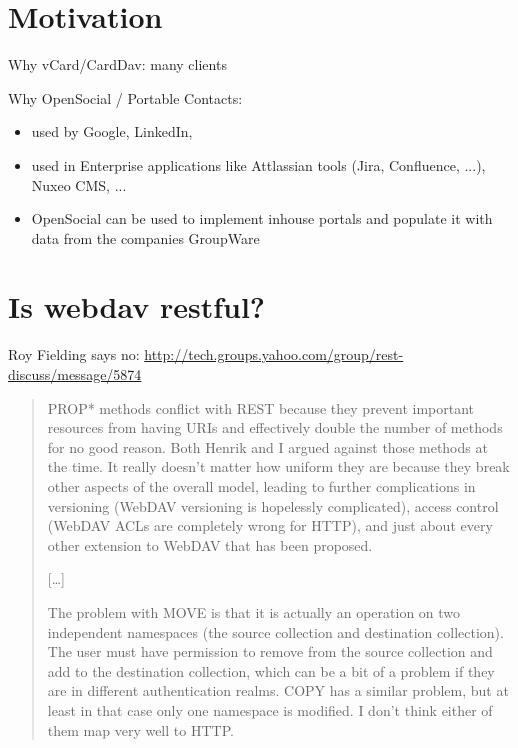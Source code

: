\documentclass[12pt,a4paper]{scrartcl}		%
\begin{document}
\title{}
\subtitle{}
\author{Thomas Koch\\\url{thomas@koch.ro}\\matriculation number 7250371}
\publishers{Fernuniversität Hagen\\Faculty of mathematics and computer science}
\date{\today}
\maketitle{}

\tableofcontents{}
\begin{abstract}

\end{abstract}
\newpage{}

\section{Motivation}

Why vCard/CardDav: many clients

Why OpenSocial / Portable Contacts:
\begin{itemize}
\item used by Google, LinkedIn,
\item used in Enterprise applications like Attlassian tools (Jira, Confluence, ...), Nuxeo CMS, ...
\item OpenSocial can be used to implement inhouse portals and populate it with data from the companies GroupWare
\end{itemize}

\section{Is webdav restful?}

Roy Fielding says no: \url{http://tech.groups.yahoo.com/group/rest-discuss/message/5874}

\begin{quotation}
PROP* methods conflict with REST because they prevent
important resources from having URIs and effectively double the
number of methods for no good reason. Both Henrik and I argued
against those methods at the time. It really doesn't matter
how uniform they are because they break other aspects of the
overall model, leading to further complications in versioning
(WebDAV versioning is hopelessly complicated), access control
(WebDAV ACLs are completely wrong for HTTP), and just about every
other extension to WebDAV that has been proposed.

[\ldots]

The problem with MOVE is that it is actually an operation on two
independent namespaces (the source collection and destination
collection). The user must have permission to remove from the
source collection and add to the destination collection, which
can be a bit of a problem if they are in different authentication
realms. COPY has a similar problem, but at least in that case
only one namespace is modified. I don't think either of them map
very well to HTTP.
\end{quotation}
\end{document}
